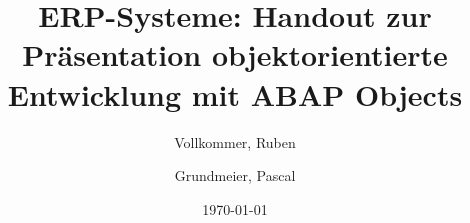 \documentclass[12pt,a4paper]{scrartcl}
\begin{document}
\title{ERP-Systeme: Handout zur Präsentation objektorientierte Entwicklung mit ABAP Objects}

\author{
  Vollkommer, Ruben\\
  \and
  Grundmeier, Pascal\\
}


\date{\today}
\maketitle

\thispagestyle{empty}

\newpage

\tableofcontents

\listoffigures

\listoftables

\renewcommand\listoflistingscaption{Liste des enthaltenen Quellcodes}
\listoflistings

\newpage

\setcounter{page}{3}








\printbibliography
\end{document}
